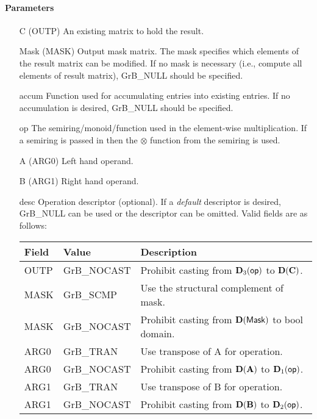 \paragraph{Parameters}

\begin{itemize}[leftmargin=1.1in]
    \item[{\sf C}]     ({\sf OUTP}) An existing matrix to hold the result.

    \item[{\sf Mask}] ({\sf MASK}) Output mask matrix. The mask
    specifies which elements of the result matrix can be modified.
    If no mask is necessary (i.e., compute all elements of result
    matrix), {\sf GrB\_NULL} should be specified.

    \item[{\sf accum}]  Function used for accumulating entries into existing
                         entries. If no accumulation is desired,
                        {\sf GrB\_NULL} should be specified.

    \item[{\sf op}]    The semiring/monoid/function used in the element-wise multiplication.
                       If a semiring is passed in then the $\otimes$ function from
                                    the semiring is used.
    \item[{\sf A}]     ({\sf ARG0}) Left hand operand.
    \item[{\sf B}]     ({\sf ARG1}) Right hand operand.
    
    \item[{\sf desc}]  Operation descriptor (optional). If a
    \emph{default} descriptor is desired, {\sf GrB\_NULL} can be
    used or the descriptor can be omitted. Valid fields are as follows: \\
    \begin{tabular}{lll}
        Field  & Value & Description \\
        \hline
        {\sf OUTP} & {\sf GrB\_NOCAST} & Prohibit casting from $\bold{D}_3({\sf op})$ to $\bold{D}({\bf C})$. \\
        {\sf MASK} & {\sf GrB\_SCMP} & Use the structural complement of {\sf mask}. \\
    {\sf MASK} & {\sf GrB\_NOCAST} & Prohibit casting from $\bold{D}({\sf Mask})$ to {\sf bool} domain. \\
    {\sf ARG0} & {\sf GrB\_TRAN} & Use transpose of {\sf A} for operation. \\
        {\sf ARG0} & {\sf GrB\_NOCAST} & Prohibit casting from $\bold{D}({\bf A})$ to $\bold{D}_1({\sf op})$. \\
    {\sf ARG1} & {\sf GrB\_TRAN} & Use transpose of {\sf B} for operation. \\
        {\sf ARG1} & {\sf GrB\_NOCAST} & Prohibit casting from $\bold{D}({\bf B})$ to $\bold{D}_2({\sf op})$. \\
    \end{tabular}
\end{itemize}

